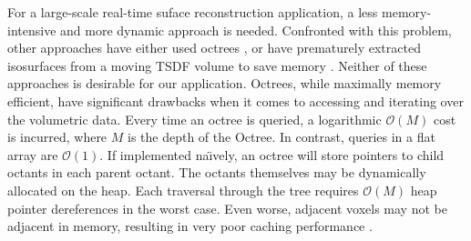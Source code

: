 \documentclass[10pt,twocolumn,letterpaper]{article}
\begin{document}
For a large-scale real-time suface reconstruction application, a less
memory-intensive and more dynamic approach is needed. Confronted with this
problem, other approaches have either used  octrees \cite{Wurm2010}, or have
prematurely extracted isosurfaces from a moving TSDF volume to save memory 
\cite{Whelan2013}. Neither of these approaches is desirable for our application.
Octrees, while maximally memory efficient, have significant drawbacks when it comes to
accessing and iterating over the volumetric data. Every time an octree is
queried,  a logarithmic $\mathcal{O}(M)$ cost is incurred, where $M$ is the depth of the
Octree. In contrast, queries in a flat array are $\mathcal{O}(1)$.  If implemented na\"{\i}vely, an
octree will store pointers to child octants in each parent octant. The octants
themselves may be dynamically allocated on the heap. Each traversal through the
tree requires $\mathcal{O}(M)$ heap pointer dereferences in the worst case.
Even worse, adjacent voxels may not be adjacent in memory, resulting in very
poor caching performance \cite{CacheStructures}. 
\end{document}
